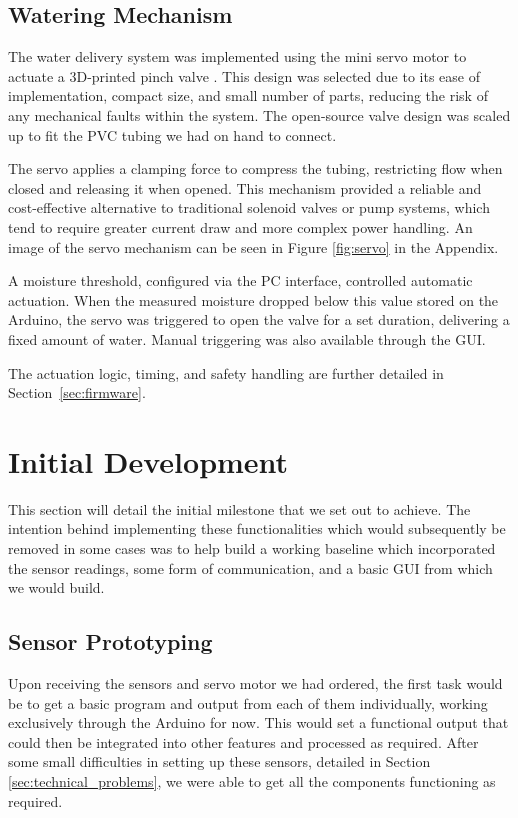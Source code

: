 \documentclass[a4paper,11pt]{article}
\begin{document}
\subsection{Watering Mechanism}
\label{sec:water_system}

The water delivery system was implemented using the mini servo motor to actuate a 
3D-printed pinch valve \cite{pinch_valve_design}. 
This design was selected due to its ease of implementation, compact size, 
and small number of parts,
reducing the risk of any mechanical faults within the system. 
The open-source valve design was scaled up 
to fit the PVC tubing we had on hand to connect.

The servo applies a clamping force to compress the tubing, restricting flow when closed 
and releasing it when opened. This mechanism provided a reliable and cost-effective 
alternative to traditional solenoid valves or pump systems, which tend to require 
greater current draw and more complex power handling.
An image of the servo mechanism can be seen in Figure \ref{fig:servo}
in the Appendix.

A moisture threshold, configured via the PC interface, controlled automatic actuation. 
When the measured moisture dropped below this value stored on the Arduino, 
the servo was triggered to open the valve for a set duration, 
delivering a fixed amount of water. 
Manual triggering was also available through the GUI.

The actuation logic, timing, and safety handling are further detailed in 
Section~\ref{sec:firmware}. 

\section{Initial Development}
\label{sec:initial_development}

This section will detail the initial milestone that we set out to achieve.
The intention behind implementing these functionalities
which would subsequently be removed in some cases
was to help build a working baseline which incorporated the sensor readings,
some form of communication, and a basic GUI from which we would build.

\subsection{Sensor Prototyping}
\label{sec:sensor_prototyping}

Upon receiving the sensors and servo motor we had ordered,
the first task would be to get a basic program and output from each of them individually,
working exclusively through the Arduino for now.
This would set a functional output that could then be integrated into other features
and processed as required.
After some small difficulties in setting up these sensors,
detailed in Section \ref{sec:technical_problems},
we were able to get all the components functioning as required.
\end{document}
